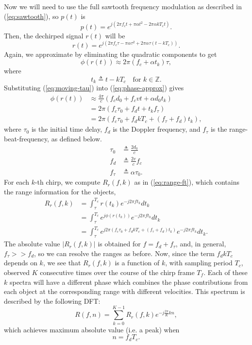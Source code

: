 Now we will need to use the full sawtooth frequency modulation as described in
(\ref{eq:sawtooth}), so $p(t)$ is
\begin{equation}
	p(t) = e^{j(2\pi f_c t+ \pi \alpha t^2 - 2\pi\alpha kT_c t)}.
\end{equation}
Then, the dechirped signal $r(t)$ will be
\begin{equation}
	r(t) = e^{j(2\pi f_c \tau - \pi \alpha \tau^2 + 2\pi\alpha\tau (t-kT_c))}.
\end{equation}
Again, we approximate by eliminating the quadratic components to get
\begin{equation}
	\phi (r(t)) \approx 2\pi (f_c + \alpha t_k)\tau,
	\label{eq:phase-approx}
\end{equation}
where 
\begin{equation}
	t_k \triangleq t - kT_c \quad \text{for }k\in\mathbb{Z}.
\end{equation}
Substituting (\ref{eq:moving-tau}) into (\ref{eq:phase-approx}) gives
\begin{align}
	\phi (r(t)) &\approx \frac{4\pi}{c}(f_c d_0 + f_c vt + \alpha d_0 t_k)\\
	&= 2\pi (f_c \tau_0 + f_d t + t_k f_{\tau})\\
	&= 2\pi (f_c \tau_0 + f_d k T_c + (f_{\tau} + f_d) t_k),
\end{align}
where $\tau_0$ is the initial time delay, $f_d$ is the Doppler frequency, and
$f_{\tau}$ is the range-beat-frequency, as defined below.
\begin{align}
	\tau_0 &\triangleq \frac{2d_0}{c}\\
	f_d &\triangleq \frac{2v}{c} f_c\\
	f_{\tau} &\triangleq \alpha\tau_0.
\end{align}
For each $k$-th chirp, we compute $R_r(f,k)$ as in (\ref{eq:range-ft}), which
contains the range information for the objects,
\begin{align}
	R_r(f,k) &= \int_{\tau}^{T_c} r(t_k)e^{-j2\pi f t_k}dt_k\\
	&= \int_{\tau}^{T_c} e^{j\phi(r(t_k))}e^{-j2\pi f t_k}dt_k\\
	&= \int_{\tau}^{T_c} e^{j2\pi (f_c \tau_0 + f_d k T_c + (f_{\tau} + f_d) t_k)}e^{-j2\pi f t_k}dt_k.
\end{align}
The absolute value $|R_r(f,k)|$ is obtained for $f = f_d + f_\tau$, and, in
general, $f_\tau >> f_d$, so we can resolve the ranges as before.
Now, since the term $f_dkT_c$ depends on $k$, we see that $R_r(f,k)$ is a 
function of $k$, with sampling period $T_c$, observed $K$ consecutive times over the course of the chirp frame
$T_f$. Each of these $k$ spectra will have a different phase which combines the
phase contributions from each object at the corresponding range with different
velocities. This spectrum is described by the following DFT:
\begin{equation}
	\label{eq:velocity-fft}
	R(f, n) = \sum_{k=0}^{K-1}R_r(f, k) e^{-j\frac{2\pi}{K}kn},
\end{equation}
which achieves maximum absolute value (i.e. a peak) when 
\begin{equation}
	n = f_d T_c.
\end{equation}

